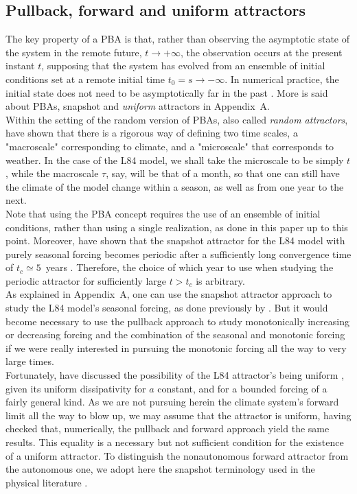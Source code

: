 \documentclass[%
 aip, cha,
 amsmath,amssymb,
 reprint,%
author-year,%
]{revtex4-1}
\newcommand{\0}{\mathbf 0}
\begin{document}
\subsection{Pullback, forward and uniform attractors} \label{ssec:PBA_v_Fwd}
The key property of a PBA is that, rather than observing the asymptotic state of the system in the remote future, $t\to + \infty$, the observation occurs at the present instant $t$, supposing that the system has evolved from an ensemble of initial conditions set at a remote initial time $t_0 = s \to - \infty$. In numerical practice, the initial state does not need to be asymptotically far in the past \citep{chekroun, Pierini.Ghil, charo}.
More is said about PBAs, snapshot and {\em uniform} attractors in Appendix~A. \\ %
Within the setting of the random version of PBAs, also called {\em random attractors}, \cite{Flandoli.ea.2022} have shown that there is a rigorous way of defining two time scales, a "macroscale" corresponding to climate, and a "microscale" that corresponds to weather. 
In the case of the L84 model, we shall take the microscale to be simply $t$, while the macroscale $\tau$, say, will be that of a month, so that one can still have the climate of the model change within a season, as well as from one year to the next. \\
Note that using the PBA concept requires the use of an ensemble of initial conditions, rather than using a single realization, as done in this paper up to this point. Moreover, \cite{drotos} have shown that the snapshot attractor for the L84 model with purely seasonal forcing becomes periodic after a sufficiently long convergence time of $t_c \simeq 5$~years \citep{drotos}. 
Therefore, the choice of which year to use when studying the periodic attractor for sufficiently large $t > t_c$ is arbitrary.  \\
As explained in Appendix~A, one can use the snapshot attractor approach to study the L84 model's seasonal forcing, as done previously by \cite{drotos}. But it would become necessary to use the pullback approach to study monotonically increasing or decreasing forcing and the combination of the seasonal and monotonic forcing if we were really interested in pursuing the monotonic forcing all the way to very large times. \\
Fortunately, \cite{Anguiano.Car.2014} have discussed the possibility of the L84 attractor's being uniform \citep{Haraux.1991,Vishik.1992}, given its uniform dissipativity for $a$ constant, and for a bounded forcing of a fairly general kind. As we are not pursuing herein the climate system's forward limit all the way to blow up, we may assume that the attractor is uniform, having checked that, numerically, the pullback and forward approach yield the same results. This equality is a necessary but not sufficient condition for the existence of a uniform attractor. To distinguish the nonautonomous forward attractor from the autonomous one, we adopt here the snapshot terminology used in the physical literature \citep{Namenson.ea.1996,Tel.ea.2020}. \\
\end{document}
